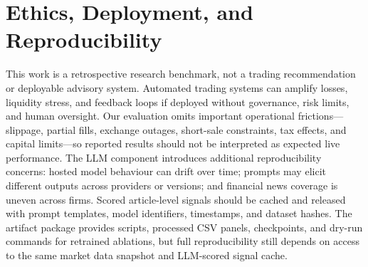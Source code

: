 \documentclass{article}
\begin{document}

\section{Ethics, Deployment, and Reproducibility}
\label{app:ethics}

This work is a retrospective research benchmark, not a trading recommendation or deployable advisory system.
Automated trading systems can amplify losses, liquidity stress, and feedback loops if deployed without governance, risk limits, and human oversight.
Our evaluation omits important operational frictions---slippage, partial fills, exchange outages, short-sale constraints, tax effects, and capital limits---so reported results should not be interpreted as expected live performance.
The LLM component introduces additional reproducibility concerns: hosted model behaviour can drift over time; prompts may elicit different outputs across providers or versions; and financial news coverage is uneven across firms.
Scored article-level signals should be cached and released with prompt templates, model identifiers, timestamps, and dataset hashes.
The artifact package provides scripts, processed CSV panels, checkpoints, and dry-run commands for retrained ablations, but full reproducibility still depends on access to the same market data snapshot and LLM-scored signal cache.

\newpage

\end{document}

